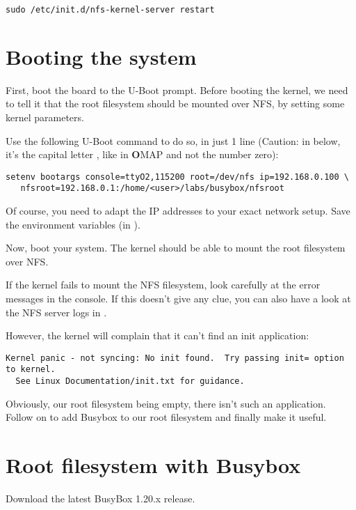 \begin{verbatim}
sudo /etc/init.d/nfs-kernel-server restart
\end{verbatim}

\section{Booting the system}

First, boot the board to the U-Boot prompt. Before booting the kernel,
we need to tell it that the root filesystem should be mounted over
NFS, by setting some kernel parameters.

Use the following U-Boot command to do so, in just 1 line
(Caution: in  below, it's the capital letter , like in
{\bf O}MAP and not the number zero):

\footnotesize
\begin{verbatim}
setenv bootargs console=ttyO2,115200 root=/dev/nfs ip=192.168.0.100 \
   nfsroot=192.168.0.1:/home/<user>/labs/busybox/nfsroot
\end{verbatim}
\normalsize

Of course, you need to adapt the IP addresses to your exact network
setup. Save the environment variables (in \code{uEnv.txt}).

Now, boot your system. The kernel should be able to mount the root
filesystem over NFS.

If the kernel fails to mount the NFS filesystem, look carefully at the
error messages in the console. If this doesn't give any clue, you can
also have a look at the NFS server logs in \code{/var/log/syslog}.

However, the kernel will complain that it can't find an init
application:

\footnotesize
\begin{verbatim}
Kernel panic - not syncing: No init found.  Try passing init= option to kernel.
  See Linux Documentation/init.txt for guidance.
\end{verbatim}
\normalsize

Obviously, our root filesystem being empty, there isn't such an
application. Follow on to add Busybox to our root filesystem and
finally make it useful.

\section{Root filesystem with Busybox}

Download the latest BusyBox 1.20.x release.

